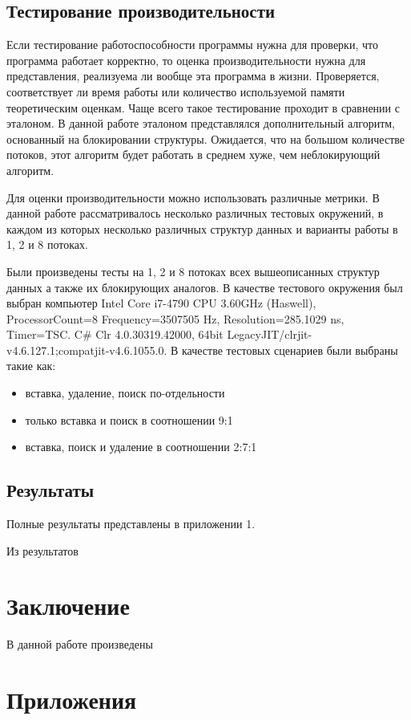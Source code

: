 \documentclass[12pt]{article}
\begin{document}
{				\subsection{Тестирование производительности}
					\par Если тестирование работоспособности программы нужна для проверки, что программа работает корректно, то оценка производительности нужна для представления, реализуема ли вообще эта программа в жизни. Проверяется, соответствует ли время работы или количество используемой памяти теоретическим оценкам. Чаще всего такое тестирование проходит в сравнении с эталоном. В данной работе эталоном представлялся дополнительный алгоритм, основанный на блокировании структуры. Ожидается, что на большом количестве потоков, этот алгоритм будет работать в среднем хуже, чем неблокирующий алгоритм.
					\par Для оценки производительности можно использовать различные метрики. В данной работе рассматривалось несколько различных тестовых окружений, в каждом из которых несколько различных структур данных и варианты работы в 1, 2 и 8 потоках. 
					\par Были произведены тесты на 1, 2 и 8 потоках всех вышеописанных структур данных а также их блокирующих аналогов. В качестве тестового окружения был выбран компьютер Intel Core i7-4790 CPU 3.60GHz (Haswell), ProcessorCount=8 Frequency=3507505 Hz, Resolution=285.1029 ns, Timer=TSC. C\# Clr 4.0.30319.42000, 64bit LegacyJIT/clrjit-v4.6.127.1;compatjit-v4.6.1055.0.
					В качестве тестовых сценариев были выбраны такие как: 
					\begin{itemize}
						\item вставка, удаление, поиск по-отдельности
						\item только вставка и поиск в соотношении 9:1
						\item вставка, поиск и удаление в соотношении 2:7:1			
					\end{itemize}
				\subsection{Результаты}
					\par Полные результаты представлены в приложении 1.
					\par Из результатов 
				
				
		\newpage
		
		\section{Заключение}
			\par В данной работе произведены 
		
		\newpage
			
			  
		
		\newpage
		
		\section{Приложения}
	}
	
\end{document}
